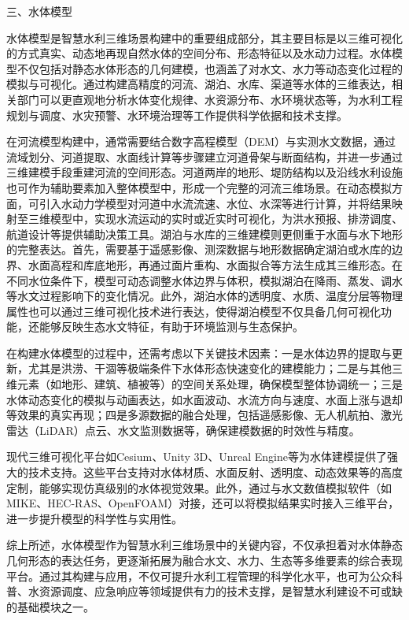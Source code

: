 三、水体模型

水体模型是智慧水利三维场景构建中的重要组成部分，其主要目标是以三维可视化的方式真实、动态地再现自然水体的空间分布、形态特征以及水动力过程。水体模型不仅包括对静态水体形态的几何建模，也涵盖了对水文、水力等动态变化过程的模拟与可视化。通过构建高精度的河流、湖泊、水库、渠道等水体的三维表达，相关部门可以更直观地分析水体变化规律、水资源分布、水环境状态等，为水利工程规划与调度、水灾预警、水环境治理等工作提供科学依据和技术支撑。

在河流模型构建中，通常需要结合数字高程模型（DEM）与实测水文数据，通过流域划分、河道提取、水面线计算等步骤建立河道骨架与断面结构，并进一步通过三维建模手段重建河流的空间形态。河道两岸的地形、堤防结构以及沿线水利设施也可作为辅助要素加入整体模型中，形成一个完整的河流三维场景。在动态模拟方面，可引入水动力学模型对河道中水流流速、水位、水深等进行计算，并将结果映射至三维模型中，实现水流运动的实时或近实时可视化，为洪水预报、排涝调度、航道设计等提供辅助决策工具。湖泊与水库的三维建模则更侧重于水面与水下地形的完整表达。首先，需要基于遥感影像、测深数据与地形数据确定湖泊或水库的边界、水面高程和库底地形，再通过面片重构、水面拟合等方法生成其三维形态。在不同水位条件下，模型可动态调整水体边界与体积，模拟湖泊在降雨、蒸发、调水等水文过程影响下的变化情况。此外，湖泊水体的透明度、水质、温度分层等物理属性也可以通过三维可视化技术进行表达，使得湖泊模型不仅具备几何可视化功能，还能够反映生态水文特征，有助于环境监测与生态保护。

在构建水体模型的过程中，还需考虑以下关键技术因素：一是水体边界的提取与更新，尤其是洪涝、干涸等极端条件下水体形态快速变化的建模能力；二是与其他三维元素（如地形、建筑、植被等）的空间关系处理，确保模型整体协调统一；三是水体动态变化的模拟与动画表达，如水面波动、水流方向与速度、水面上涨与退却等效果的真实再现；四是多源数据的融合处理，包括遥感影像、无人机航拍、激光雷达（LiDAR）点云、水文监测数据等，确保建模数据的时效性与精度。

现代三维可视化平台如Cesium、Unity 3D、Unreal Engine等为水体建模提供了强大的技术支持。这些平台支持对水体材质、水面反射、透明度、动态效果等的高度定制，能够实现仿真级别的水体视觉效果。此外，通过与水文数值模拟软件（如MIKE、HEC-RAS、OpenFOAM）对接，还可以将模拟结果实时接入三维平台，进一步提升模型的科学性与实用性。

综上所述，水体模型作为智慧水利三维场景中的关键内容，不仅承担着对水体静态几何形态的表达任务，更逐渐拓展为融合水文、水力、生态等多维要素的综合表现平台。通过其构建与应用，不仅可提升水利工程管理的科学化水平，也可为公众科普、水资源调度、应急响应等领域提供有力的技术支撑，是智慧水利建设不可或缺的基础模块之一。

